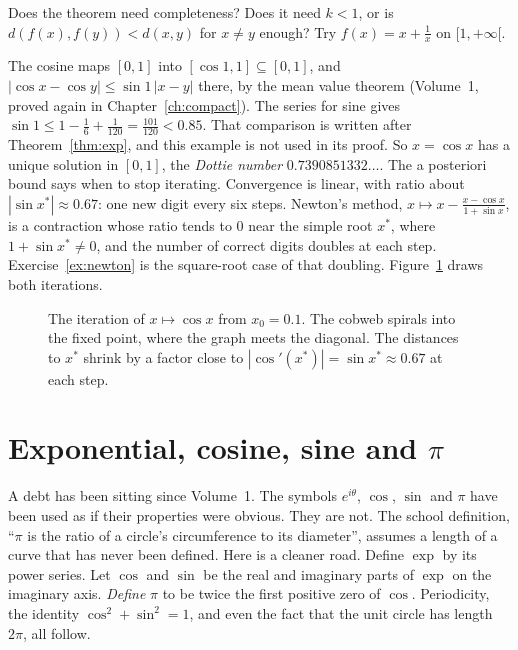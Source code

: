 \begin{think}
Does the theorem need completeness? Does it need $k<1$, or is $d(f(x),f(y))<d(x,y)$ for $x\ne y$ enough? Try $f(x)=x+\frac1x$ on $[1,+\infty[$.
\end{think}

\begin{example}\label{ex:cosfixed}
The cosine maps $[0,1]$ into $[\cos1,1]\subseteq[0,1]$, and $|\cos x-\cos y|\le\sin1\,|x-y|$ there, by the mean value theorem (Volume~1, proved again in Chapter~\ref{ch:compact}). The series for sine gives $\sin1\le1-\frac16+\frac1{120}=\frac{101}{120}<0.85$. That comparison is written after Theorem~\ref{thm:exp}, and this example is not used in its proof. So $x=\cos x$ has a unique solution in $[0,1]$, the \emph{Dottie number} $0.7390851332\ldots$. The a posteriori bound says when to stop iterating. Convergence is linear, with ratio about $|\sin x^*|\approx0.67$: one new digit every six steps. Newton's method, $x\mapsto x-\frac{x-\cos x}{1+\sin x}$, is a contraction whose ratio tends to $0$ near the simple root $x^*$, where $1+\sin x^*\ne 0$, and the number of correct digits doubles at each step. Exercise~\ref{ex:newton} is the square-root case of that doubling. Figure~\ref{fig:cobweb} draws both iterations.
\end{example}

\begin{figure}[ht]
\centering
{}
\caption{The iteration of $x\mapsto\cos x$ from $x_0=0.1$. The cobweb spirals into the fixed point, where the graph meets the diagonal. The distances to $x^*$ shrink by a factor close to $|\cos'(x^*)|=\sin x^*\approx0.67$ at each step.}
\label{fig:cobweb}
\end{figure}

\section{Exponential, cosine, sine and \texorpdfstring{$\pi$}{pi}}

A debt has been sitting since Volume~1. The symbols $e^{i\theta}$, $\cos$, $\sin$ and $\pi$ have been used as if their properties were obvious. They are not. The school definition, ``$\pi$ is the ratio of a circle's circumference to its diameter'', assumes a length of a curve that has never been defined. Here is a cleaner road. Define $\exp$ by its power series. Let $\cos$ and $\sin$ be the real and imaginary parts of $\exp$ on the imaginary axis. \emph{Define} $\pi$ to be twice the first positive zero of $\cos$. Periodicity, the identity $\cos^2+\sin^2=1$, and even the fact that the unit circle has length $2\pi$, all follow.

